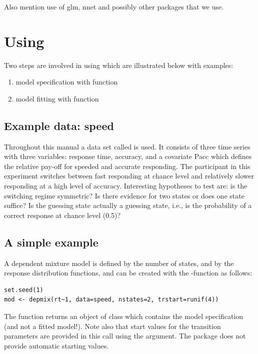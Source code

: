 \documentclass[article]{jss}
\begin{document}
Also mention use of glm, nnet and possibly other packages that we use. 


\section{Using }

Two steps are involved in using  which are illustrated
below with examples:
\begin{enumerate}
	\item model specification with function 
	
	\item  model fitting with function 
\end{enumerate}

\subsection{Example data: speed}

Throughout this manual a data set called  is used.  It
consists of three time series with three variables: response time,
accuracy, and a covariate Pacc which defines the relative pay-off for
speeded and accurate responding.  The participant in this experiment
switches between fast responding at chance level and relatively slower
responding at a high level of accuracy.  Interesting hypotheses to
test are: is the switching regime symmetric?  Is there evidence for
two states or does one state suffice?  Is the guessing state actually
a guessing state, i.e., is the probability of a correct response at
chance level (0.5)?

\subsection{A simple example}

A dependent mixture model is defined by the number of states, and by
the response distribution functions, and can be created with the
-function as follows:

\begin{verbatim} 
set.seed(1)
mod <- depmix(rt~1, data=speed, nstates=2, trstart=runif(4))
\end{verbatim}
The  function returns an object of class 
which contains the model specification (and not a fitted model!).
Note also that start values for the transition parameters are provided
in this call using the  argument. The package does not 
provide automatic starting values. 
\end{document}
